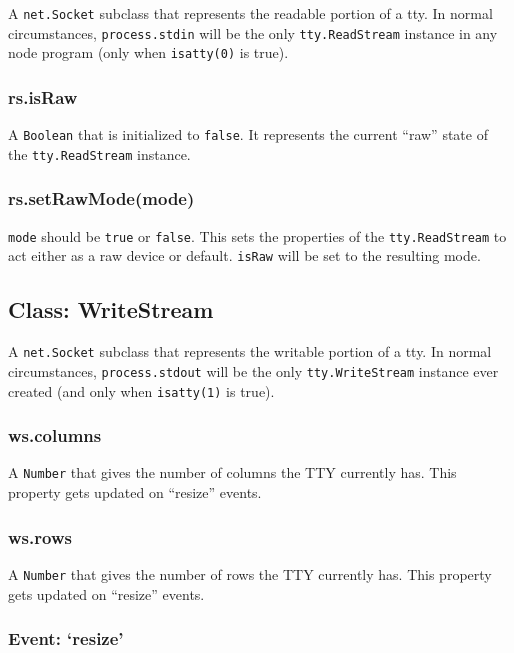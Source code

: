 A \texttt{net.Socket} subclass that represents the readable portion of a
tty. In normal circumstances, \texttt{process.stdin} will be the only
\texttt{tty.ReadStream} instance in any node program (only when
\texttt{isatty(0)} is true).

\subsubsection{rs.isRaw}\label{rs.israw}

A \texttt{Boolean} that is initialized to \texttt{false}. It represents
the current ``raw'' state of the \texttt{tty.ReadStream} instance.

\subsubsection{rs.setRawMode(mode)}\label{rs.setrawmodemode}

\texttt{mode} should be \texttt{true} or \texttt{false}. This sets the
properties of the \texttt{tty.ReadStream} to act either as a raw device
or default. \texttt{isRaw} will be set to the resulting mode.

\subsection{Class: WriteStream}\label{class-writestream}

A \texttt{net.Socket} subclass that represents the writable portion of a
tty. In normal circumstances, \texttt{process.stdout} will be the only
\texttt{tty.WriteStream} instance ever created (and only when
\texttt{isatty(1)} is true).

\subsubsection{ws.columns}\label{ws.columns}

A \texttt{Number} that gives the number of columns the TTY currently
has. This property gets updated on ``resize'' events.

\subsubsection{ws.rows}\label{ws.rows}

A \texttt{Number} that gives the number of rows the TTY currently has.
This property gets updated on ``resize'' events.

\subsubsection{Event: `resize'}\label{event-resize}

